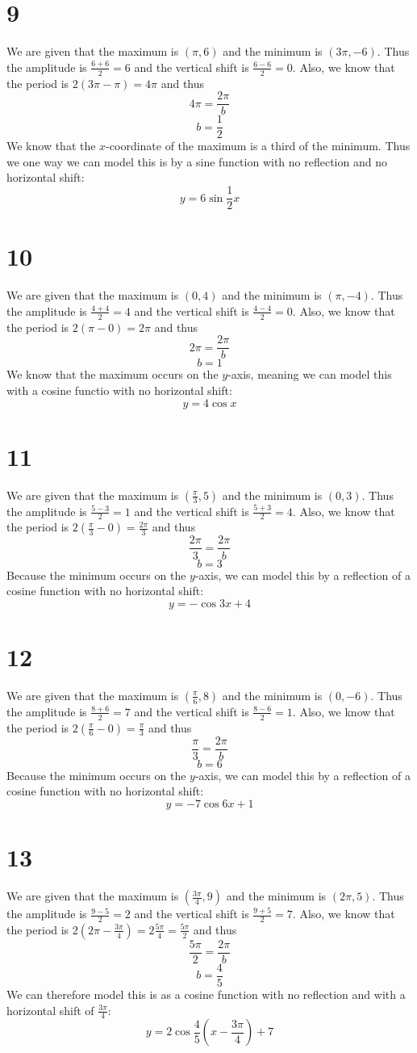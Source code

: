 \documentclass{article}
\theoremstyle{definition}
\newcommand{\?}{\stackrel{?}{=}}
\begin{document}
\section*{9}
We are given that the maximum is $(\pi,6)$ and the minimum is $(3\pi,-6)$. Thus the amplitude is $\frac{6+6}{2}=6$ and the vertical shift is $\frac{6-6}{2}=0$. Also, we know that the period is
$2(3\pi-\pi)=4\pi$ and thus \[ 4\pi=\frac{2\pi}{b} \] \[ b=\frac{1}{2} \] We know that the $x$-coordinate of the maximum is a third of the minimum. Thus we one way we can model this is by a sine function 
with no reflection and no horizontal shift: \[ y=6\sin\frac{1}{2}x \]

\section*{10}
We are given that the maximum is $(0,4)$ and the minimum is $(\pi,-4)$. Thus the amplitude is $\frac{4+4}{2}=4$ and the vertical shift is $\frac{4-4}{2}=0$. Also, we know that the period is
$2(\pi-0)=2\pi$ and thus \[ 2\pi=\frac{2\pi}{b} \] \[ b=1 \] We know that the maximum occurs on the $y$-axis, meaning we can model this with a cosine functio with no horizontal shift:
\[ y=4\cos x\] 

\section*{11}
We are given that the maximum is $(\frac{\pi}{3},5)$ and the minimum is $(0,3)$. Thus the amplitude is $\frac{5-3}{2}=1$ and the vertical shift is $\frac{5+3}{2}=4$. Also, we know that the period is
$2(\frac{\pi}{3}-0)=\frac{2\pi}{3}$ and thus \[ \frac{2\pi}{3}=\frac{2\pi}{b} \] \[ b=3 \] Because the minimum occurs on the $y$-axis, we can model this by a reflection of a cosine function with no 
horizontal shift: \[ y=-\cos 3x+4 \]

\section*{12}
We are given that the maximum is $(\frac{\pi}{6},8)$ and the minimum is $(0,-6)$. Thus the amplitude is $\frac{8+6}{2}=7$ and the vertical shift is $\frac{8-6}{2}=1$. Also, we know that the period is
$2(\frac{\pi}{6}-0)=\frac{\pi}{3}$ and thus \[ \frac{\pi}{3}=\frac{2\pi}{b} \] \[ b=6 \] Because the minimum occurs on the $y$-axis, we can model this by a reflection of a cosine function with no horizontal shift:
\[ y=-7\cos 6x+1 \]

\section*{13}
We are given that the maximum is $(\frac{3\pi}{4},9)$ and the minimum is $(2\pi,5)$. Thus the amplitude is $\frac{9-5}{2}=2$ and the vertical shift is $\frac{9+5}{2}=7$. Also, we know that the period is
$2(2\pi-\frac{3\pi}{4})=2\frac{5\pi}{4}=\frac{5\pi}{2}$ and thus \[ \frac{5\pi}{2}=\frac{2\pi}{b} \] \[ b=\frac{4}{5} \] We can therefore model this is as a cosine function with no reflection and with a horizontal shift 
of $\frac{3\pi}{4}$: \[ y=2\cos\frac{4}{5}(x-\frac{3\pi}{4})+7 \]
\end{document}
